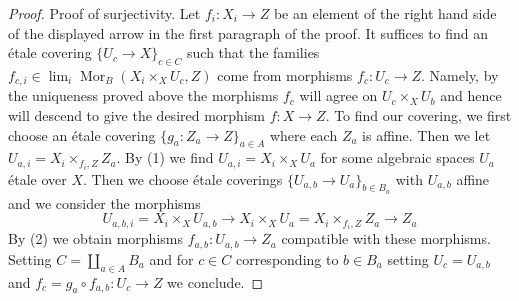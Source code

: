\documentclass[10pt,a4paper]{amsart}
\theoremstyle{plain}
\theoremstyle{definition}
\theoremstyle{remark}
\numberwithin{equation}{subsection}
\def\lim{\mathop{\mathrm{lim}}\nolimits}
\def\Mor{\mathop{\mathrm{Mor}}\nolimits}
\begin{document}
\begin{proof}
\medskip\noindent
Proof of surjectivity. Let $f_i : X_i \to Z$ be an element of the
right hand side of the displayed arrow in the first paragraph of the proof.
It suffices to find an \'etale covering $\{U_c \to X\}_{c \in C}$
such that the families $f_{c, i} \in \lim_i \Mor_B(X_i \times_X U_c, Z)$
come from morphisms $f_c : U_c \to Z$. Namely, by the uniqueness
proved above the morphisms $f_c$ will agree on $U_c \times_X U_b$
and hence will descend to give the desired morphism $f : X \to Z$.
To find our covering, we first choose an \'etale covering
$\{g_a : Z_a \to Z\}_{a \in A}$ where each $Z_a$ is affine. Then we let
$U_{a, i} = X_i \times_{f_i, Z} Z_a$. By (1) we find
$U_{a, i} = X_i \times_X U_a$ for some algebraic spaces $U_a$ \'etale
over $X$. Then we choose \'etale coverings
$\{U_{a, b} \to U_a\}_{b \in B_a}$
with $U_{a, b}$ affine and we consider the morphisms
$$
U_{a, b, i} = X_i \times_X U_{a, b} \to
X_i \times_X U_a = X_i \times_{f_i, Z} Z_a \to Z_a
$$
By (2) we obtain morphisms $f_{a, b} : U_{a, b} \to Z_a$ compatible with these
morphisms. Setting $C = \coprod_{a \in A} B_a$ and for $c \in C$
corresponding to $b \in B_a$ setting $U_c = U_{a, b}$ and
$f_c = g_a \circ f_{a, b} : U_c \to Z$ we conclude.
\end{proof}
\end{document}
